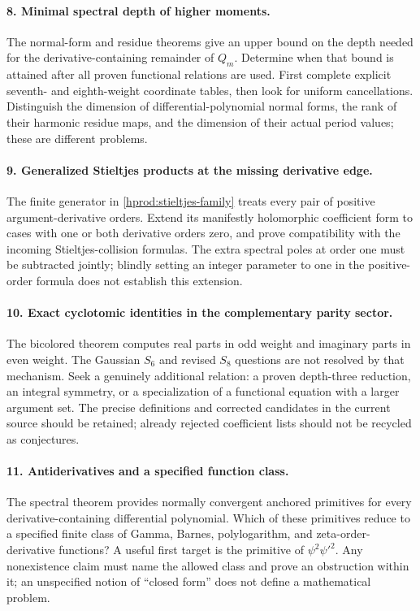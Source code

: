 \documentclass[11pt,a4paper]{article}
\numberwithin{equation}{section}
\theoremstyle{definition}
\theoremstyle{remark}
\begin{document}
\paragraph{8. Minimal spectral depth of higher moments.}
The normal-form and residue theorems give an upper bound on the
depth needed for the derivative-containing remainder of $Q_m$.
Determine when that bound is attained after all proven functional
relations are used.  First complete explicit seventh- and eighth-weight
coordinate tables, then look for uniform cancellations.
Distinguish the dimension of differential-polynomial normal forms,
the rank of their harmonic residue maps, and the dimension of their
actual period values; these are different problems.

\paragraph{9. Generalized Stieltjes products at the missing derivative edge.}
The finite generator in \eqref{hprod:stieltjes-family} treats every
pair of positive argument-derivative orders.  Extend its manifestly
holomorphic coefficient form to cases with one or both derivative
orders zero, and prove compatibility with the incoming
Stieltjes-collision formulas.  The extra spectral poles at order one
must be subtracted jointly; blindly setting an integer parameter to
one in the positive-order formula does not establish this extension.

\paragraph{10. Exact cyclotomic identities in the complementary parity sector.}
The bicolored theorem computes real parts in odd weight and imaginary
parts in even weight.  The Gaussian $S_6$ and revised $S_8$ questions
are not resolved by that mechanism.  Seek a genuinely additional
relation: a proven depth-three reduction, an integral symmetry, or a
specialization of a functional equation with a larger argument set.
The precise definitions and corrected candidates in the current
source should be retained; already rejected coefficient lists should
not be recycled as conjectures.

\paragraph{11. Antiderivatives and a specified function class.}
The spectral theorem provides normally convergent anchored primitives
for every derivative-containing differential polynomial.
Which of these primitives reduce to a specified finite class of
Gamma, Barnes, polylogarithm, and zeta-order-derivative functions?
A useful first target is the primitive of $\psi^2\psi'^2$.
Any nonexistence claim must name the allowed class and prove an
obstruction within it; an unspecified notion of ``closed form''
does not define a mathematical problem.
\end{document}
